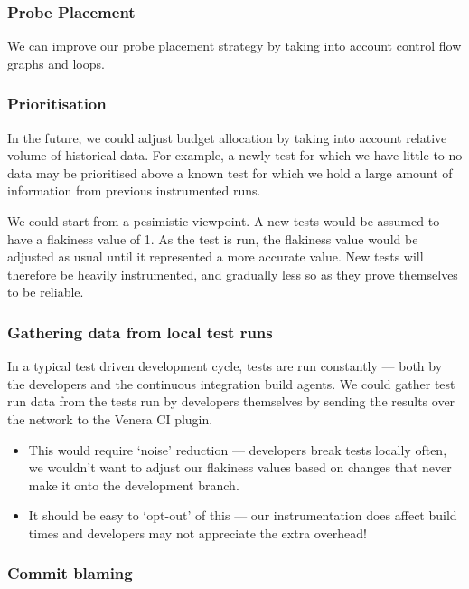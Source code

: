 \subsubsection{Probe Placement}

We can improve our probe placement strategy by taking into account control flow
graphs and loops.

\subsubsection{Prioritisation}

In the future, we could adjust \flaky budget allocation by taking into account
relative volume of historical data. For example, a newly \flaky test for which
we have little to no data may be prioritised above a known \flaky test for which
we hold a large amount of information from previous instrumented runs.

We could start from a pesimistic viewpoint. A new tests would be assumed to have
a flakiness value of 1. As the test is run, the flakiness value would be
adjusted as usual until it represented a more accurate value. New tests will
therefore be heavily instrumented, and gradually less so as they prove
themselves to be reliable.

\subsubsection{Gathering data from local test runs}

In a typical test driven development cycle, tests are run constantly --- both by
the developers and the continuous integration build agents. We could gather test
run data from the tests run by developers themselves by sending the results over
the network to the Venera CI plugin.

\begin{itemize}
	\item This would require {\lq}noise{\rq} reduction --- developers break tests
	locally often, we wouldn't want to adjust our flakiness values based on
	changes that never make it onto the development branch.
	\item It should be easy to {\lq}opt-out{\rq} of this --- our instrumentation
	does affect build times and developers may not appreciate the extra overhead!
\end{itemize}

\subsubsection{Commit blaming}

